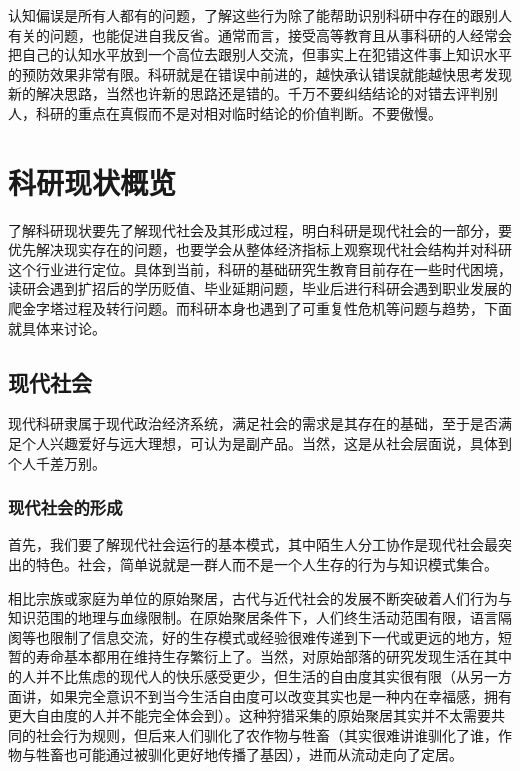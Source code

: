 \documentclass[]{tufte-book}
\begin{document}
认知偏误是所有人都有的问题，了解这些行为除了能帮助识别科研中存在的跟别人有关的问题，也能促进自我反省。通常而言，接受高等教育且从事科研的人经常会把自己的认知水平放到一个高位去跟别人交流，但事实上在犯错这件事上知识水平的预防效果非常有限。科研就是在错误中前进的，越快承认错误就能越快思考发现新的解决思路，当然也许新的思路还是错的。千万不要纠结结论的对错去评判别人，科研的重点在真假而不是对相对临时结论的价值判断。不要傲慢。

\hypertarget{view}{%
\chapter{科研现状概览}\label{view}}

了解科研现状要先了解现代社会及其形成过程，明白科研是现代社会的一部分，要优先解决现实存在的问题，也要学会从整体经济指标上观察现代社会结构并对科研这个行业进行定位。具体到当前，科研的基础研究生教育目前存在一些时代困境，读研会遇到扩招后的学历贬值、毕业延期问题，毕业后进行科研会遇到职业发展的爬金字塔过程及转行问题。而科研本身也遇到了可重复性危机等问题与趋势，下面就具体来讨论。

\hypertarget{ux73b0ux4ee3ux793eux4f1a}{%
\section{现代社会}\label{ux73b0ux4ee3ux793eux4f1a}}

现代科研隶属于现代政治经济系统，满足社会的需求是其存在的基础，至于是否满足个人兴趣爱好与远大理想，可认为是副产品。当然，这是从社会层面说，具体到个人千差万别。

\hypertarget{ux73b0ux4ee3ux793eux4f1aux7684ux5f62ux6210}{%
\subsection{现代社会的形成}\label{ux73b0ux4ee3ux793eux4f1aux7684ux5f62ux6210}}

首先，我们要了解现代社会运行的基本模式，其中陌生人分工协作是现代社会最突出的特色。社会，简单说就是一群人而不是一个人生存的行为与知识模式集合。

相比宗族或家庭为单位的原始聚居，古代与近代社会的发展不断突破着人们行为与知识范围的地理与血缘限制。在原始聚居条件下，人们终生活动范围有限，语言隔阂等也限制了信息交流，好的生存模式或经验很难传递到下一代或更远的地方，短暂的寿命基本都用在维持生存繁衍上了。当然，对原始部落的研究发现生活在其中的人并不比焦虑的现代人的快乐感受更少，但生活的自由度其实很有限（从另一方面讲，如果完全意识不到当今生活自由度可以改变其实也是一种内在幸福感，拥有更大自由度的人并不能完全体会到）。这种狩猎采集的原始聚居其实并不太需要共同的社会行为规则，但后来人们驯化了农作物与牲畜（其实很难讲谁驯化了谁，作物与牲畜也可能通过被驯化更好地传播了基因），进而从流动走向了定居。
\end{document}
